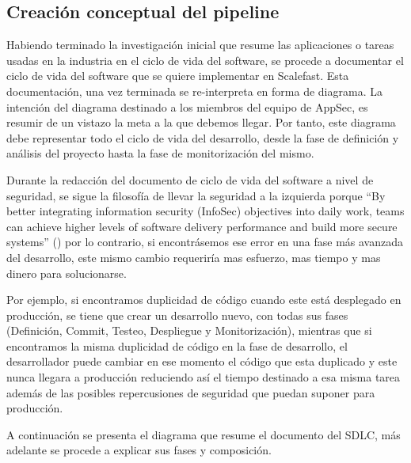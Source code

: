 \documentclass[12pt]{report} %
\begin{document}
\subsection{Creación conceptual del pipeline}

Habiendo terminado la investigación inicial que resume las aplicaciones o tareas
usadas en la industria en el ciclo de vida del software, se procede a documentar
el ciclo de vida del software que se quiere implementar en Scalefast.
Esta documentación, una vez terminada se re-interpreta en forma de diagrama.
La intención del diagrama destinado a los miembros del equipo de
\acrfull{AppSec}, es resumir de un vistazo la meta a la que debemos llegar.
Por tanto, este diagrama debe representar todo el ciclo de vida del desarrollo,
desde la fase de definición y análisis del proyecto hasta la fase de
monitorización del mismo.
 
Durante la redacción del documento de ciclo de vida del software a nivel de
seguridad, se sigue la filosofía de llevar la seguridad a la izquierda porque
``By better integrating information security (InfoSec) objectives into daily
work, teams can achieve higher levels of software delivery performance and build
more secure systems'' (\cite{GoogleDOT})
por lo contrario, si encontrásemos ese error en una fase más avanzada del
desarrollo, este mismo cambio requeriría mas esfuerzo, mas tiempo y mas dinero
para solucionarse.

Por ejemplo, si encontramos duplicidad de código cuando este está desplegado en
producción, se tiene que crear un desarrollo nuevo, con todas sus fases
(Definición, Commit, Testeo, Despliegue y Monitorización), mientras que si
encontramos la misma duplicidad de código en la fase de desarrollo, el
desarrollador puede cambiar en ese momento el código que esta duplicado y este
nunca llegara a producción reduciendo así el tiempo destinado a esa misma tarea
además de las posibles repercusiones de seguridad que puedan suponer para
producción. 

A continuación se presenta el diagrama que resume el documento del \gls{SDLC},
más adelante se procede a explicar sus fases y composición.
\end{document}
